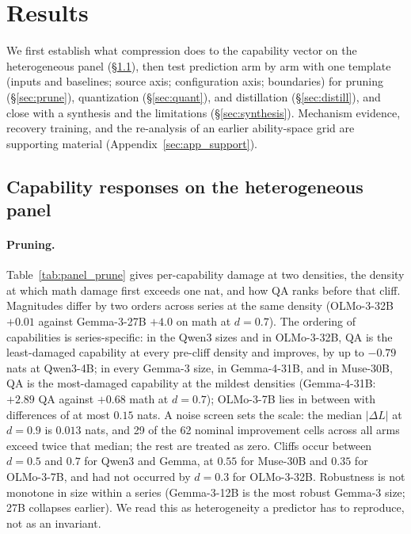 \section{Results}
\label{sec:exp}

We first establish what compression does to the capability vector on
the heterogeneous panel (\S\ref{sec:phenomena}), then test prediction
arm by arm with one template (inputs and baselines; source axis;
configuration axis; boundaries) for pruning (\S\ref{sec:prune}),
quantization (\S\ref{sec:quant}), and distillation
(\S\ref{sec:distill}), and close with a synthesis and the limitations
(\S\ref{sec:synthesis}). Mechanism evidence, recovery training, and the
re-analysis of an earlier ability-space grid are supporting material
(Appendix~\ref{sec:app_support}).

\subsection{Capability responses on the heterogeneous panel}
\label{sec:phenomena}



\paragraph{Pruning.} Table~\ref{tab:panel_prune} gives per-capability
damage at two densities, the density at which math damage first exceeds
one nat, and how QA ranks before that cliff. Magnitudes differ by two
orders across series at the same density (OLMo-3-32B $+0.01$ against
Gemma-3-27B $+4.0$ on math at $d=0.7$). The ordering of capabilities is
series-specific: in the Qwen3 sizes and in OLMo-3-32B, QA is the
least-damaged capability at every pre-cliff density and improves, by up
to $-0.79$ nats at Qwen3-4B; in every Gemma-3 size, in Gemma-4-31B,
and in Muse-30B, QA is the most-damaged capability at the mildest
densities (Gemma-4-31B: $+2.89$ QA against $+0.68$ math at $d=0.7$);
OLMo-3-7B lies in between with differences of at most $0.15$ nats. A
noise screen sets the scale: the median $|\Delta L|$ at $d=0.9$ is
$0.013$ nats, and 29 of the 62 nominal improvement cells across all
arms exceed twice that median; the rest are treated as zero. Cliffs
occur between $d=0.5$ and $0.7$ for Qwen3 and Gemma, at $0.55$ for
Muse-30B and $0.35$ for OLMo-3-7B, and had not occurred by $d=0.3$ for
OLMo-3-32B. Robustness is not monotone in size within a series
(Gemma-3-12B is the most robust Gemma-3 size; 27B collapses earlier).
We read this as heterogeneity a predictor has to reproduce, not as an
invariant.

